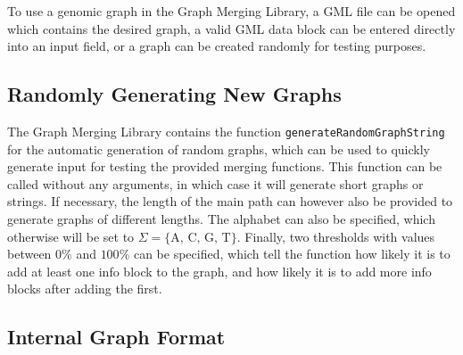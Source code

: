 \documentclass[a4paper,12pt,twoside,BCOR=10mm]{scrbook}
\begin{document}
To use a genomic graph in the Graph Merging Library,
a GML file can be opened which contains the desired graph,
a valid GML data block can be entered directly into an input field,
or a graph can be created randomly for testing purposes.

\subsection{Randomly Generating New Graphs}

The Graph Merging Library contains the function \texttt{generateRandomGraphString} for
the automatic generation of random graphs, which can be used to quickly generate input for testing the
provided merging functions.
This function can be called without any arguments, in which case it will generate short graphs
or strings. If necessary, the length of the main path can however also be provided to generate
graphs of different lengths. The alphabet can also be specified, which otherwise will be
set to $ \Sigma = \{ \textrm{A, C, G, T} \} $. Finally, two thresholds with values between $ 0\% $ and $ 100\% $ can
be specified, which tell the function how likely it is to add at least one info block to the graph,
and how likely it is to add more info blocks after adding the first.


\subsection{Internal Graph Format}
\label{sec:internal_graph_format}
\end{document}
